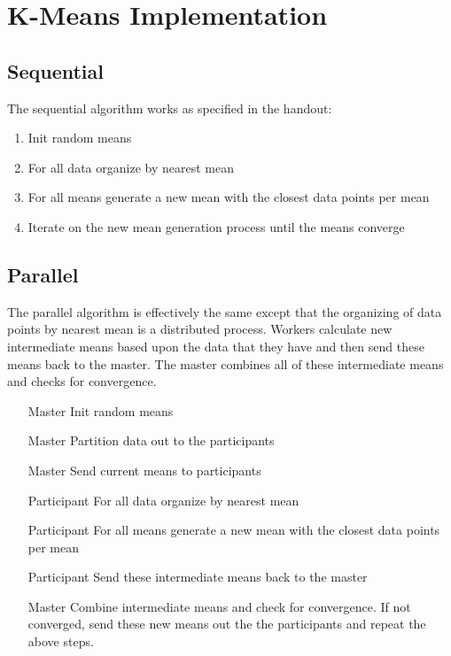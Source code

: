 \documentclass[12pt]{article}
\begin{document}
\section{K-Means Implementation}

\subsection{Sequential}
The sequential algorithm works as specified in the handout:

\begin{enumerate}

\item
Init random means

\item
For all data organize by nearest mean

\item
For all means generate a new mean with the closest data points per mean

\item
Iterate on the new mean generation process until the means converge

\end{enumerate}

\subsection{Parallel}

The parallel algorithm is effectively the same except that the organizing of data points by nearest mean is a distributed process. Workers calculate new intermediate means based upon the data that they have and then send these means back to the master. The master combines all of these intermediate means and checks for convergence.

\begin{enumerate}

\item
[Master] Init random means

\item
[Master] Partition data out to the participants

\item
[Master] Send current means to participants

\item
[Participant] For all data organize by nearest mean

\item
[Participant] For all means generate a new mean with the closest data points per mean

\item
[Participant] Send these intermediate means back to the master

\item
[Master] Combine intermediate means and check for convergence. If not converged, send these new means out the the participants and repeat the above steps.

\end{enumerate}
\end{document}
